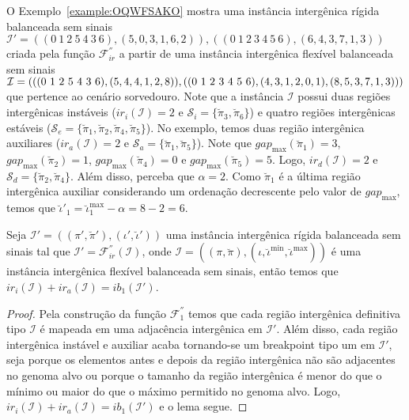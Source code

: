 O Exemplo~\ref{example:OQWFSAKO} mostra uma instância intergênica rígida balanceada sem sinais $\mathcal{I}' = ((0~1~2~5~4~3~6),(5,0,3,1,6,2)),((0~1~2~3~4~5~6),(6,4,3,7,1,3))$ criada pela função $\mathcal{F}_{ir}^{''}$ a partir de uma instância intergênica flexível balanceada sem sinais $\mathcal{I} = (((0~1~2~5~4~3~6),(5,4,4,\break1,2,8)),((0~1~2~3~4~5~6),(4,3,1,2,0,1),(8,5,3,7,1,3)))$ que pertence ao cenário sorvedouro. Note que a instância $\mathcal{I}$ possui duas regiões intergênicas instáveis ($ir_i(\mathcal{I}) = 2$ e $\mathcal{S}_{i}=\{\breve\pi_3,\breve\pi_6\}$) e quatro regiões intergênicas estáveis ($\mathcal{S}_{e}=\{\breve\pi_1,\breve\pi_2,\breve\pi_4,\breve\pi_5\}$). No exemplo, temos duas região intergênica auxiliares ($ir_a(\mathcal{I}) = 2$ e $\mathcal{S}_{a}=\{\breve\pi_1,\breve\pi_5\}$). Note que $gap_{\max}(\breve\pi_1) = 3$, $gap_{\max}(\breve\pi_2) = 1$, $gap_{\max}(\breve\pi_4) = 0$ e $gap_{\max}(\breve\pi_5) = 5$. Logo, $ir_d(\mathcal{I}) = 2$ e $\mathcal{S}_{d}=\{\breve\pi_2,\breve\pi_4\}$. Além disso, perceba que $\alpha = 2$. Como $\breve\pi_1$ é a última região intergênica auxiliar considerando um ordenação decrescente pelo valor de $gap_{\max}$, temos que $\breve\iota'_1 = \breve\iota^{\max}_1 -\alpha = 8 - 2 = 6$.



\begin{lemma}\label{lemma:KPGCUTDM}
Seja $\mathcal{I'} = ((\pi',\breve\pi'),(\iota',\breve\iota'))$ uma instância intergênica rígida balanceada sem sinais tal que $\mathcal{I'} = \mathcal{F}_{ir}^{''}(\mathcal{I})$, onde $\mathcal{I} = ((\pi,\breve\pi),(\iota,\breve\iota^{\min},\breve\iota^{\max}))$ é uma instância intergênica flexível balanceada sem sinais, então temos que $ir_i(\mathcal{I}) + ir_a(\mathcal{I}) = ib_1(\mathcal{I'})$.
\end{lemma}
\begin{proof}
Pela construção da função $\mathcal{F}_{1}^{''}$ temos que cada região intergênica definitiva tipo $\mathcal{I}$ é mapeada em uma adjacência intergênica em $\mathcal{I'}$. Além disso, cada região intergênica instável e auxiliar acaba tornando-se um breakpoint tipo um em $\mathcal{I'}$, seja porque os elementos antes e depois da região intergênica não são adjacentes no genoma alvo ou porque o tamanho da região intergênica é menor do que o mínimo ou maior do que o máximo permitido no genoma alvo. Logo, $ir_i(\mathcal{I}) + ir_a(\mathcal{I}) = ib_1(\mathcal{I'})$ e o lema segue.
\end{proof}

